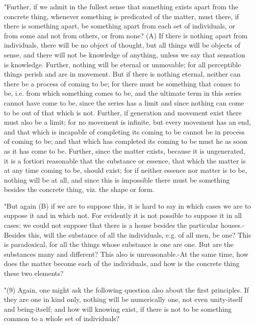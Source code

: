"Further, if we admit in the fullest sense that something exists apart
from the concrete thing, whenever something is predicated of the matter,
must there, if there is something apart, be something apart from each
set of individuals, or from some and not from others, or from none?
(A) If there is nothing apart from individuals, there will be no object
of thought, but all things will be objects of sense, and there will
not be knowledge of anything, unless we say that sensation is knowledge.
Further, nothing will be eternal or unmovable; for all perceptible
things perish and are in movement. But if there is nothing eternal,
neither can there be a process of coming to be; for there must be
something that comes to be, i.e. from which something comes to be,
and the ultimate term in this series cannot have come to be, since
the series has a limit and since nothing can come to be out of that
which is not. Further, if generation and movement exist there must
also be a limit; for no movement is infinite, but every movement has
an end, and that which is incapable of completing its coming to be
cannot be in process of coming to be; and that which has completed
its coming to be must he as soon as it has come to be. Further, since
the matter exists, because it is ungenerated, it is a fortiori reasonable
that the substance or essence, that which the matter is at any time
coming to be, should exist; for if neither essence nor matter is to
be, nothing will be at all, and since this is impossible there must
be something besides the concrete thing, viz. the shape or form.

"But again (B) if we are to suppose this, it is hard to say in which
cases we are to suppose it and in which not. For evidently it is not
possible to suppose it in all cases; we could not suppose that there
is a house besides the particular houses.-Besides this, will the substance
of all the individuals, e.g. of all men, be one? This is paradoxical,
for all the things whose substance is one are one. But are the substances
many and different? This also is unreasonable.-At the same time, how
does the matter become each of the individuals, and how is the concrete
thing these two elements? 

"(9) Again, one might ask the following question also about the first
principles. If they are one in kind only, nothing will be numerically
one, not even unity-itself and being-itself; and how will knowing
exist, if there is not to be something common to a whole set of individuals?

